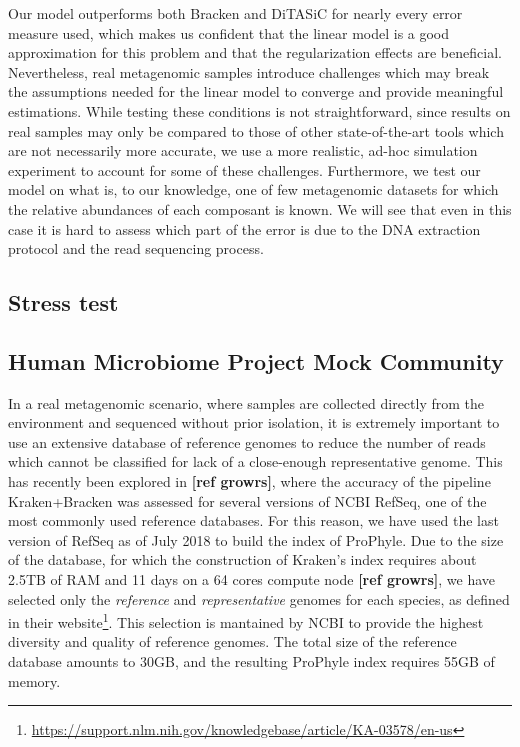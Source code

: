 Our model outperforms both Bracken and DiTASiC for nearly every error measure used, which makes us confident that the linear model is a good approximation for this problem and that the regularization effects are beneficial. Nevertheless, real metagenomic samples introduce challenges which may break the assumptions needed for the linear model to converge and provide meaningful estimations. While testing these conditions is not straightforward, since results on real samples may only be compared to those of other state-of-the-art tools which are not necessarily more accurate, we use a more realistic, ad-hoc simulation experiment to account for some of these challenges. Furthermore, we test our model on what is, to our knowledge, one of few metagenomic datasets for which the relative abundances of each composant is known. We will see that even in this case it is hard to assess which part of the error is due to the DNA extraction protocol and the read sequencing process.

\subsection{Stress test}

\subsection{Human Microbiome Project Mock Community}

In a real metagenomic scenario, where samples are collected directly from the environment and sequenced without prior isolation, it is extremely important to use an extensive database of reference genomes to reduce the number of reads which cannot be classified for lack of a close-enough representative genome. This has recently been explored in \textbf{[ref growrs]}, where the accuracy of the pipeline Kraken+Bracken was assessed for several versions of NCBI RefSeq, one of the most commonly used reference databases. For this reason, we have used the last version of RefSeq as of July 2018 to build the index of ProPhyle. Due to the size of the database, for which the construction of Kraken's index requires about 2.5TB of RAM and 11 days on a 64 cores compute node \textbf{[ref growrs]}, we have selected only the \textit{reference} and \textit{representative} genomes for each species, as defined in their website\footnote{\url{https://support.nlm.nih.gov/knowledgebase/article/KA-03578/en-us}}. This selection is mantained by NCBI to provide the highest diversity and quality of reference genomes. The total size of the reference database amounts to 30GB, and the resulting ProPhyle index requires 55GB of memory.


